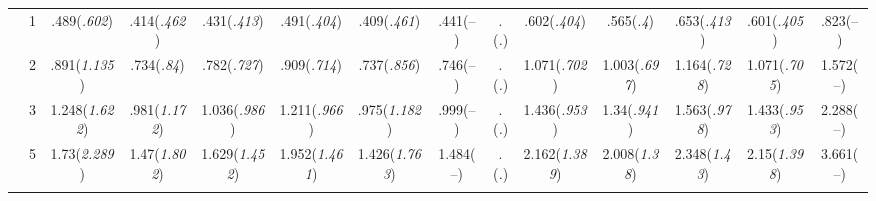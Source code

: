 \documentclass{article}
\begin{document}
\begin{table}[tbp]
{\begin{tabularx}{\textwidth}{lCCCCCCCCCCCCC}
&1&.489\newline (\emph{.602})&.414\newline (\emph{.462})&.431\newline (\emph{.413})&.491\newline (\emph{.404})&.409\newline (\emph{.461})&.441\newline (--)&.\newline (\emph{.})&.602\newline (\emph{.404})&.565\newline (\emph{.4})&.653\newline (\emph{.413})&.601\newline (\emph{.405})&.823\newline (--) \tabularnewline
&2&.891\newline (\emph{1.135})&.734\newline (\emph{.84})&.782\newline (\emph{.727})&.909\newline (\emph{.714})&.737\newline (\emph{.856})&.746\newline (--)&.\newline (\emph{.})&1.071\newline (\emph{.702})&1.003\newline (\emph{.697})&1.164\newline (\emph{.728})&1.071\newline (\emph{.705})&1.572\newline (--) \tabularnewline
&3&1.248\newline (\emph{1.622})&.981\newline (\emph{1.172})&1.036\newline (\emph{.986})&1.211\newline (\emph{.966})&.975\newline (\emph{1.182})&.999\newline (--)&.\newline (\emph{.})&1.436\newline (\emph{.953})&1.34\newline (\emph{.941})&1.563\newline (\emph{.978})&1.433\newline (\emph{.953})&2.288\newline (--) \tabularnewline
&5&1.73\newline (\emph{2.289})&1.47\newline (\emph{1.802})&1.629\newline (\emph{1.452})&1.952\newline (\emph{1.461})&1.426\newline (\emph{1.763})&1.484\newline (--)&.\newline (\emph{.})&2.162\newline (\emph{1.389})&2.008\newline (\emph{1.38})&2.348\newline (\emph{1.43})&2.15\newline (\emph{1.398})&3.661\newline (--) \tabularnewline
\bottomrule \addlinespace[1.5ex]


\end{tabularx}}
\end{table}
\end{document}
